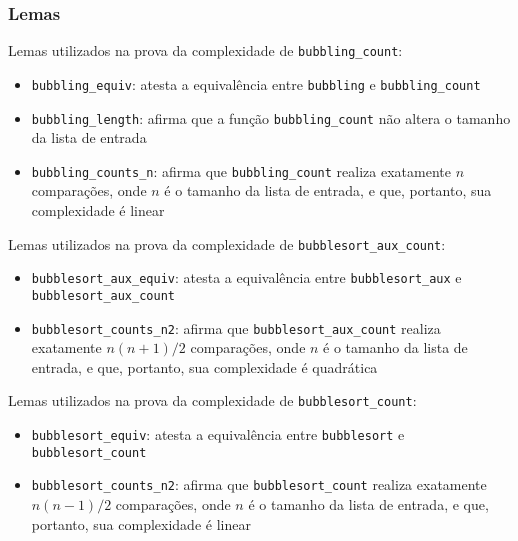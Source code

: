 \subsubsection{Lemas}
Lemas utilizados na prova da complexidade de \texttt{bubbling\_count}:
\begin{itemize}
    \item \texttt{bubbling\_equiv}: atesta a equivalência entre \texttt{bubbling} e \texttt{bubbling\_count}
    \item \texttt{bubbling\_length}: afirma que a função \texttt{bubbling\_count} não altera o tamanho da lista de entrada
    \item \texttt{bubbling\_counts\_n}: afirma que \texttt{bubbling\_count} realiza exatamente $n$ comparações, onde $n$ é o tamanho da lista de entrada, e que, portanto, sua complexidade é linear
\end{itemize}
Lemas utilizados na prova da complexidade de \texttt{bubblesort\_aux\_count}:
\begin{itemize}
    \item \texttt{bubblesort\_aux\_equiv}: atesta a equivalência entre \texttt{bubblesort\_aux} e \texttt{bubblesort\_aux\_count}
    \item \texttt{bubblesort\_counts\_n2}: afirma que \texttt{bubblesort\_aux\_count} realiza exatamente $n(n+1)/2$ comparações, onde $n$ é o tamanho da lista de entrada, e que, portanto, sua complexidade é quadrática
\end{itemize}
Lemas utilizados na prova da complexidade de \texttt{bubblesort\_count}:
\begin{itemize}
    \item \texttt{bubblesort\_equiv}: atesta a equivalência entre \texttt{bubblesort} e \texttt{bubblesort\_count}
    \item \texttt{bubblesort\_counts\_n2}: afirma que \texttt{bubblesort\_count} realiza exatamente $n(n-1)/2$ comparações, onde $n$ é o tamanho da lista de entrada, e que, portanto, sua complexidade é linear
\end{itemize}


